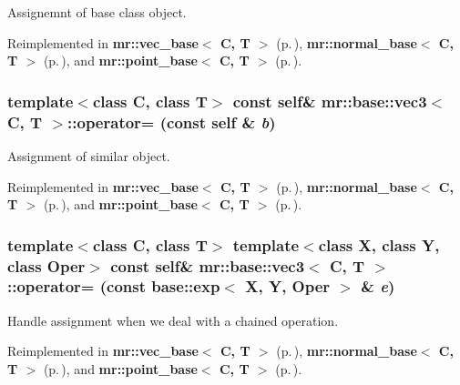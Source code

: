 Assignemnt of base class object. 



Reimplemented in {\bf mr::vec\_\-base$<$ C, T $>$} {\rm (p.\,\pageref{structmr_1_1vec__base_z60_2})}, {\bf mr::normal\_\-base$<$ C, T $>$} {\rm (p.\,\pageref{structmr_1_1normal__base_z69_2})}, and {\bf mr::point\_\-base$<$ C, T $>$} {\rm (p.\,\pageref{structmr_1_1point__base_z77_2})}.
\subsubsection{\setlength{\rightskip}{0pt plus 5cm}template$<$class C, class T$>$ const {\bf self}\& {\bf mr::base::vec3}$<$ C, T $>$::operator= (const {\bf self} \& {\em b})\hspace{0.3cm}{\tt  [inline]}}\label{structmr_1_1base_1_1vec3_z36_1}


Assignment of similar object. 



Reimplemented in {\bf mr::vec\_\-base$<$ C, T $>$} {\rm (p.\,\pageref{structmr_1_1vec__base_z60_1})}, {\bf mr::normal\_\-base$<$ C, T $>$} {\rm (p.\,\pageref{structmr_1_1normal__base_z69_1})}, and {\bf mr::point\_\-base$<$ C, T $>$} {\rm (p.\,\pageref{structmr_1_1point__base_z77_1})}.
\subsubsection{\setlength{\rightskip}{0pt plus 5cm}template$<$class C, class T$>$ template$<$class X, class Y, class Oper$>$ const {\bf self}\& {\bf mr::base::vec3}$<$ C, T $>$::operator= (const {\bf base::exp}$<$ X, Y, Oper $>$ \& {\em e})\hspace{0.3cm}{\tt  [inline]}}\label{structmr_1_1base_1_1vec3_z36_0}


Handle assignment when we deal with a chained operation. 



Reimplemented in {\bf mr::vec\_\-base$<$ C, T $>$} {\rm (p.\,\pageref{structmr_1_1vec__base_z60_0})}, {\bf mr::normal\_\-base$<$ C, T $>$} {\rm (p.\,\pageref{structmr_1_1normal__base_z69_0})}, and {\bf mr::point\_\-base$<$ C, T $>$} {\rm (p.\,\pageref{structmr_1_1point__base_z77_0})}.
